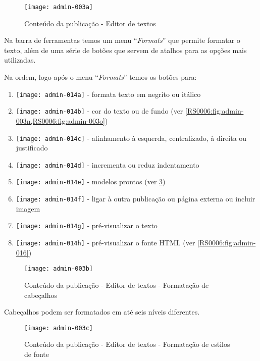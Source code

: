 \begin{figure}[!ht]
    \centering
    \texttt{[image: admin-003a]}
    \caption{Conteúdo da publicação - Editor de textos}\label{RS0006:fig:admin-003a}
\end{figure}

Na barra de ferramentas temos um menu ``\textit{Formats}'' que permite formatar o texto, além de uma série de botões que servem de atalhos para as opções mais utilizadas.

Na ordem, logo após o menu ``\textit{Formats}'' temos os botões para:

\begin{enumerate}
    \item {\texttt{[image: admin-014a]}} - formata texto em negrito ou itálico
    \item {\texttt{[image: admin-014b]}} - cor do texto ou de fundo (ver \cref{RS0006:fig:admin-003n,RS0006:fig:admin-003o})
    \item {\texttt{[image: admin-014c]}} - alinhamento à esquerda, centralizado, à direita ou justificado
    \item {\texttt{[image: admin-014d]}} - incrementa ou reduz indentamento
    \item {\texttt{[image: admin-014e]}} - modelos prontos (ver \cref{RS0006:fig:admin-003c})
    \item {\texttt{[image: admin-014f]}} - ligar à outra publicação ou página externa ou incluir imagem
    \item {\texttt{[image: admin-014g]}} - pré-visualizar o texto
    \item {\texttt{[image: admin-014h]}} - pré-visualizar o fonte \gls{HTML} (ver \cref{RS0006:fig:admin-016})
\end{enumerate}

\begin{figure}[!ht]
    \centering
    \texttt{[image: admin-003b]}
    \caption{Conteúdo da publicação - Editor de textos - Formatação de cabeçalhos}\label{RS0006:fig:admin-003b}
\end{figure}

Cabeçalhos podem ser formatados em até seis níveis diferentes.

\begin{figure}[!ht]
    \centering
    \texttt{[image: admin-003c]}
    \caption{Conteúdo da publicação - Editor de textos - Formatação de estilos de fonte}\label{RS0006:fig:admin-003c}
\end{figure}

